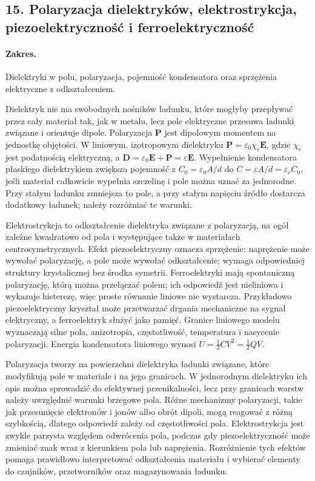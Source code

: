 \documentclass[11pt,a4paper]{article}
\begin{document}
\subsection{15. Polaryzacja dielektryków, elektrostrykcja, piezoelektryczność i ferroelektryczność}
\paragraph{Zakres.} Dielektryki w polu, polaryzacja, pojemność kondensatora oraz sprzężenia elektryczne z odkształceniem.

Dielektryk nie ma swobodnych nośników ładunku, które mogłyby przepływać przez cały materiał tak, jak w metalu, lecz pole elektryczne przesuwa ładunki związane i orientuje dipole. Polaryzacja $\mathbf P$ jest dipolowym momentem na jednostkę objętości. W liniowym, izotropowym dielektryku $\mathbf P=\varepsilon_0\chi_e\mathbf E$, gdzie $\chi_e$ jest podatnością elektryczną, a $\mathbf D=\varepsilon_0\mathbf E+\mathbf P=\varepsilon\mathbf E$. Wypełnienie kondensatora płaskiego dielektrykiem zwiększa pojemność z $C_0=\varepsilon_0A/d$ do $C=\varepsilon A/d=\varepsilon_rC_0$, jeśli materiał całkowicie wypełnia szczelinę i pole można uznać za jednorodne. Przy stałym ładunku zmniejsza to pole, a przy stałym napięciu źródło dostarcza dodatkowy ładunek; należy rozróżniać te warunki.

Elektrostrykcja to odkształcenie dielektryka związane z polaryzacją, na ogół zależne kwadratowo od pola i występujące także w materiałach centrosymetrycznych. Efekt piezoelektryczny oznacza sprzężenie: naprężenie może wywołać polaryzację, a pole może wywołać odkształcenie; wymaga odpowiedniej struktury krystalicznej bez środka symetrii. Ferroelektryki mają spontaniczną polaryzację, którą można przełączać polem; ich odpowiedź jest nieliniowa i wykazuje histerezę, więc proste równanie liniowe nie wystarcza. Przykładowo piezoelektryczny kryształ może przetwarzać drgania mechaniczne na sygnał elektryczny, a ferroelektryk służyć jako pamięć. Granice liniowego modelu wyznaczają silne pola, anizotropia, częstotliwość, temperatura i nasycenie polaryzacji. Energia kondensatora liniowego wynosi $U=\tfrac12CV^2=\tfrac12QV$.

Polaryzacja tworzy na powierzchni dielektryka ładunki związane, które modyfikują pole w materiale i na jego granicach. W jednorodnym dielektryku ich opis można sprowadzić do efektywnej przenikalności, lecz przy granicach warstw należy uwzględnić warunki brzegowe pola. Różne mechanizmy polaryzacji, takie jak przesunięcie elektronów i jonów albo obrót dipoli, mogą reagować z różną szybkością, dlatego odpowiedź zależy od częstotliwości pola. Elektrostrykcja jest zwykle parzysta względem odwrócenia pola, podczas gdy piezoelektryczność może zmieniać znak wraz z kierunkiem pola lub naprężenia. Rozróżnienie tych efektów pomaga prawidłowo interpretować odkształcenia materiału i wybierać elementy do czujników, przetworników oraz magazynowania ładunku.
\end{document}
